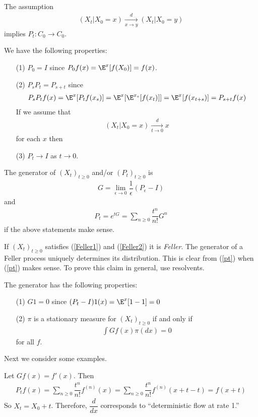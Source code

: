 \begin{note}
The assumption
\begin{align}
\label{Feller1}
(X_t | X_0 = x) \xrightarrow[x \to y]{d} (X_t | X_0 =y) 
\end{align}
implies $P_t: C_0 \to C_0$.
\end{note}

We have the following properties: 
\begin{enumerate}
\item[(1)] $P_0 = I$ since $P_0 f(x) = \E^{x} [f(X_0)] = f(x)$. 
\item[(2)] $P_s P_t = P_{s + t}$
since
$$\begin{aligned}
P_s P_t f(x) = \E^{x}[P_t f(x_s) ] = \E^{x} [ \E^{x_s} [ f(x_t) ] ] 
= \E^{x} [ f(x_{t+s})]  
=  P_{s+t} f(x)
\end{aligned}$$
If we assume that
\begin{align}
\label{Feller2}
(X_t | X_0 = x) \xrightarrow[t \to 0]{d} x
\end{align}
for each $x$ then
\item[(3)] $P_t \to I$ as $t \to 0$. 
\end{enumerate}

\begin{defn}
The generator of $(X_t)_{t \geq 0}$ and/or $(P_t)_{t \geq 0}$ is
$$\begin{aligned}
G = \lim_{\epsilon \to 0} \dfrac{1}{\epsilon} (P_{\epsilon} - I)
\end{aligned}$$
and 
\begin{align}
\label{pt}
P_t = e^{tG} = \sum_{n \geq 0} \dfrac{t^{n}}{n!} G^n
\end{align}
if the above statements make sense. 
\end{defn}

\begin{note}
If $(X_t)_{t \geq 0}$ satisfies (\ref{Feller1}) and (\ref{Feller2}) it is {\em Feller}.
The generator of a Feller process uniquely determines its distribution. This is clear from (\ref{pt})
when (\ref{pt}) makes sense. To prove this claim in general, use resolvents. 
\end{note}
The generator has the following properties:
\begin{enumerate}
\item[(1)] $G1 = 0$ since $(P_t - I)1(x) = \E^{x}[1 - 1] = 0$
\item[(2)] $\pi$ is a stationary measure for $(X_t)_{t \geq 0}$ if and only if 
$$\begin{aligned}
\int G f(x) \pi (dx) = 0
\end{aligned}$$
for all $f$. 
\end{enumerate}
Next we consider some examples. 
\begin{exmp}
Let $Gf(x) = f'(x)$. Then 
$$\begin{aligned}
P_t f(x) =  \sum_{n \geq 0} \dfrac{t^{n}}{n!} f^{(n)}(x) =  \sum_{n \geq 0} \dfrac{t^{n}}{n!} f^{(n)}(x + t - t) =  f(x+t)
\end{aligned}$$
So $X_t = X_0 + t$. Therefore, $\dfrac{d}{dx}$ corresponds to ``deterministic flow at rate 1.''
\end{exmp}

